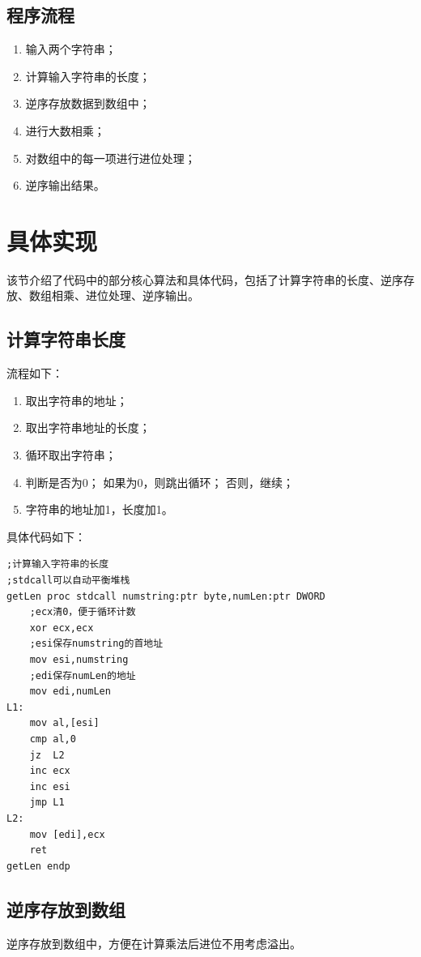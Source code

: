 \subsection{程序流程}
\begin{enumerate}
    \item 输入两个字符串；
    \item 计算输入字符串的长度；
    \item 逆序存放数据到数组中；
    \item 进行大数相乘；
    \item 对数组中的每一项进行进位处理；
    \item 逆序输出结果。
\end{enumerate}

\section{具体实现}
该节介绍了代码中的部分核心算法和具体代码，包括了计算字符串的长度、逆序存放、数组相乘、进位处理、逆序输出。

\subsection{计算字符串长度}
流程如下：
\begin{enumerate}
    \item 取出字符串的地址；
    \item 取出字符串地址的长度；
    \item 循环取出字符串；
    \item 判断是否为0；
        \iitem 如果为0，则跳出循环；
        \iitem 否则，继续；
    \item 字符串的地址加1，长度加1。
\end{enumerate}

具体代码如下：
\begin{lstlisting}
;计算输入字符串的长度
;stdcall可以自动平衡堆栈
getLen proc stdcall	numstring:ptr byte,numLen:ptr DWORD	
    ;ecx清0，便于循环计数	
    xor ecx,ecx		
    ;esi保存numstring的首地址											
    mov esi,numstring	
    ;edi保存numLen的地址										
    mov edi,numLen												
L1:
    mov al,[esi]
    cmp al,0
    jz  L2
    inc ecx
    inc esi
    jmp L1
L2:
    mov [edi],ecx
    ret   
getLen endp

\end{lstlisting}

\subsection{逆序存放到数组}
逆序存放到数组中，方便在计算乘法后进位不用考虑溢出。

